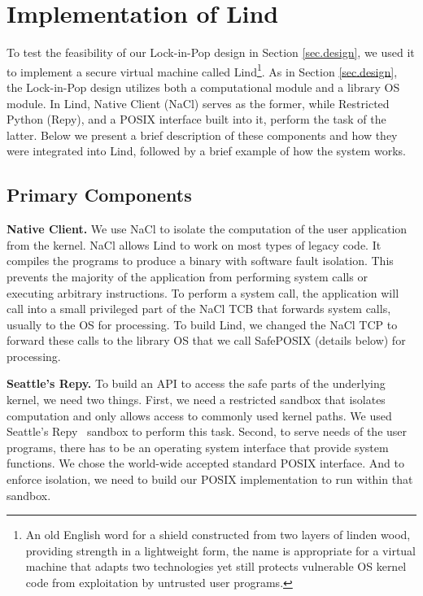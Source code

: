 \section{Implementation of Lind}
\label{sec.implementation}

To test the feasibility of our Lock-in-Pop design in
Section \ref{sec.design}, we used it to implement a secure virtual machine
called Lind\footnote{\scriptsize An old English word for a shield constructed from two layers of
linden wood, providing strength in a lightweight form, the name is appropriate for
a virtual machine that adapts two technologies\textendash
yet still protects vulnerable OS kernel code from exploitation by
untrusted user programs.}. 
As in Section \ref{sec.design}, the Lock-in-Pop design utilizes both a
computational module and a library OS module. In Lind, Native Client (NaCl) serves as the former,
while Restricted Python (Repy), and a POSIX interface built into it, perform the task of the latter.
Below we present a brief description of these components and how they were integrated
into Lind, followed by a brief example of how the system works.

\subsection{Primary Components}

\textbf{Native Client.}
We use NaCl to isolate the computation of the user application
from the kernel. NaCl allows Lind to work on most types of legacy code.
It compiles the programs to produce a binary with software fault isolation.
This prevents the majority of the application from performing system calls
or executing arbitrary instructions.
To perform a system call, the application will call into a small privileged
part of the NaCl TCB that forwards system calls, usually to the OS for
processing. To build Lind, we changed the NaCl TCP to
forward these calls to the library OS that we call SafePOSIX (details below)
for processing.

\textbf{Seattle's Repy.}
To build an API to access the safe parts of the underlying kernel, we need
two things. First, we need a restricted sandbox that isolates computation
and only allows access to commonly used kernel paths.  We used
Seattle's Repy~\cite{Repy-10} sandbox to perform this task.
Second, to serve needs of the user programs, there has to be an operating system interface that 
provide system functions. We chose the world-wide accepted standard POSIX interface. 
And to enforce isolation, we need to build our POSIX implementation to run within that sandbox.

